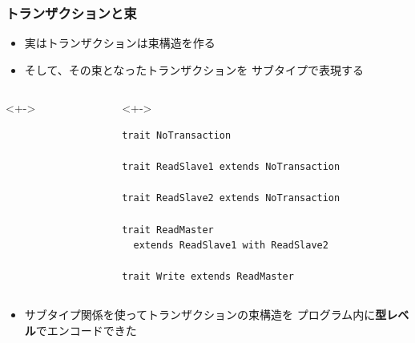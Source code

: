 \begin{frame}[fragile]
  \frametitle{トランザクションと束}
 
  \begin{itemize}
    \item<+-> 実はトランザクションは束構造を作る
    \item<+-> そして、その束となったトランザクションを
    サブタイプで表現する
  \end{itemize}

  \begin{columns}
    \begin{column}{0.3\textwidth}
      \begin{uncoverenv}<+->
      \end{uncoverenv}
    \end{column}

    \begin{column}{0.7\textwidth}
      \begin{uncoverenv}<+->
\begin{lstlisting}[style=scala]
trait NoTransaction
 
trait ReadSlave1 extends NoTransaction

trait ReadSlave2 extends NoTransaction
 
trait ReadMaster
  extends ReadSlave1 with ReadSlave2

trait Write extends ReadMaster
\end{lstlisting}
      \end{uncoverenv}
    \end{column}
  \end{columns}

  \begin{itemize}
    \item<+-> サブタイプ関係を使ってトランザクションの束構造を
    プログラム内に\textbf{型レベル}でエンコードできた
  \end{itemize}
\end{frame}
 
